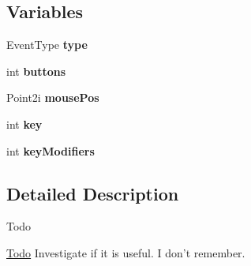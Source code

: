 \subsection*{Variables}
\begin{DoxyCompactItemize}
\item 
\hypertarget{group___event_ga2f18e60350b641236ab0e724d0622d1d}{Event\-Type {\bfseries type}}\label{group___event_ga2f18e60350b641236ab0e724d0622d1d}

\item 
\hypertarget{group___event_gab25f60de6d1c5f370231402aa1097c95}{int {\bfseries buttons}}\label{group___event_gab25f60de6d1c5f370231402aa1097c95}

\item 
\hypertarget{group___event_ga5ab63f7168dcb5a7a76af31f43f13018}{Point2i {\bfseries mouse\-Pos}}\label{group___event_ga5ab63f7168dcb5a7a76af31f43f13018}

\item 
\hypertarget{group___event_ga35af0be900467fedbb610bd6ea65ed78}{int {\bfseries key}}\label{group___event_ga35af0be900467fedbb610bd6ea65ed78}

\item 
\hypertarget{group___event_gad17583f4b163df5f7e7b9e55883c5314}{int {\bfseries key\-Modifiers}}\label{group___event_gad17583f4b163df5f7e7b9e55883c5314}

\end{DoxyCompactItemize}


\subsection{Detailed Description}
\begin{DoxyRefDesc}{Todo}
\item[\hyperlink{todo__todo000003}{Todo}]Investigate if it is useful. I don't remember.\end{DoxyRefDesc}
